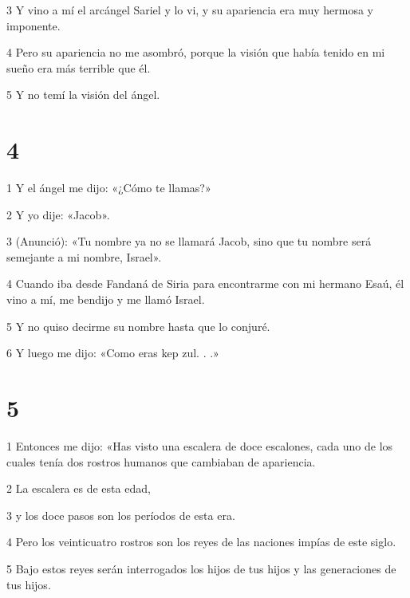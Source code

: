 \par 3 Y vino a mí el arcángel Sariel y lo vi, y su apariencia era muy hermosa y imponente.

\par 4 Pero su apariencia no me asombró, porque la visión que había tenido en mi sueño era más terrible que él.

\par 5 Y no temí la visión del ángel.

\chapter{4}

\par 1 Y el ángel me dijo: «¿Cómo te llamas?»

\par 2 Y yo dije: «Jacob».

\par 3 (Anunció): «Tu nombre ya no se llamará Jacob, sino que tu nombre será semejante a mi nombre, Israel».

\par 4 Cuando iba desde Fandaná de Siria para encontrarme con mi hermano Esaú, él vino a mí, me bendijo y me llamó Israel.

\par 5 Y no quiso decirme su nombre hasta que lo conjuré.

\par 6 Y luego me dijo: «Como eras kep zul. . .»

\chapter{5}

\par 1 Entonces me dijo: «Has visto una escalera de doce escalones, cada uno de los cuales tenía dos rostros humanos que cambiaban de apariencia.

\par 2 La escalera es de esta edad,

\par 3 y los doce pasos son los períodos de esta era.

\par 4 Pero los veinticuatro rostros son los reyes de las naciones impías de este siglo.

\par 5 Bajo estos reyes serán interrogados los hijos de tus hijos y las generaciones de tus hijos.

